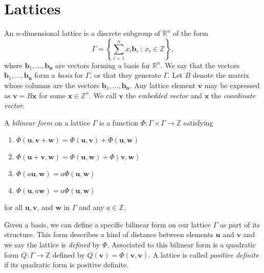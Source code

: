 
\section{Lattices}
\label{sec:Lattices}

An $n$-dimensional lattice is a discrete subgroup of $\mathbb{R}^n$ of the form
\[\Gamma = \left\{ \sum_{i=1}^n x_i \mathbf{b}_i \ : \ x_i \in \mathbb{Z} \right\},\]
where $\mathbf{b}_1, \dots, \mathbf{b_n}$ are vectors forming a basis for $\mathbb{R}^n$. We say that the vectors $\mathbf{b}_1, \dots, \mathbf{b_n}$ form a \textit{basis} for $\Gamma$, or that they generate $\Gamma$. Let $B$ denote the matrix whose columns are the vectors $\mathbf{b}_1, \dots, \mathbf{b_n}$. Any lattice element $\mathbf{v}$ may be expressed as $\mathbf{v} = B\mathbf{x}$ for some $\mathbf{x} \in \mathbb{Z}^n$. We call $\mathbf{v}$ the \textit{embedded vector} and $\mathbf{x}$ the \textit{coordinate vector}.

A \textit{bilinear form} on a lattice $\Gamma$ is a function $\Phi: \Gamma \times \Gamma \to \mathbb{Z}$ satisfying
\begin{enumerate}
\item $\Phi(\mathbf{u}, \mathbf{v}+\mathbf{w}) = \Phi(\mathbf{u},\mathbf{v}) + \Phi(\mathbf{u},\mathbf{w})$
\item $\Phi(\mathbf{u}+\mathbf{v}, \mathbf{w}) = \Phi(\mathbf{u},\mathbf{w}) + \Phi(\mathbf{v},\mathbf{w})$
\item $\Phi(a\mathbf{u}, \mathbf{w}) = a\Phi(\mathbf{u},\mathbf{w})$
\item $\Phi(\mathbf{u}, a\mathbf{w}) = a\Phi(\mathbf{u},\mathbf{w})$
\end{enumerate}
for all $\mathbf{u}, \mathbf{v}$, and $\mathbf{w}$ in $\Gamma$ and any $a \in \mathbb{Z}$. 

Given a basis, we can define a specific bilinear form on our lattice $\Gamma$ as part of its structure. This form describes a kind of distance between elements $\mathbf{u}$ and $\mathbf{v}$ and we say the lattice is \textit{defined} by $\Phi$. Associated to this bilinear form is a quadratic form $Q: \Gamma \to \mathbb{Z}$ defined by $Q(\mathbf{v}) = \Phi(\mathbf{v}, \mathbf{v})$. A lattice is called \textit{positive definite} if its quadratic form is positive definite. 

